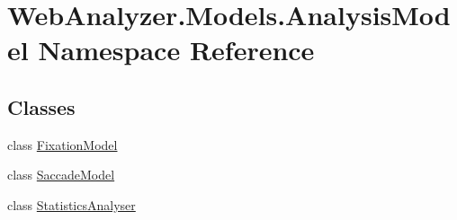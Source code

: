 \hypertarget{namespace_web_analyzer_1_1_models_1_1_analysis_model}{}\section{Web\+Analyzer.\+Models.\+Analysis\+Model Namespace Reference}
\label{namespace_web_analyzer_1_1_models_1_1_analysis_model}
\subsection*{Classes}
\begin{DoxyCompactItemize}
\item 
class \hyperlink{class_web_analyzer_1_1_models_1_1_analysis_model_1_1_fixation_model}{Fixation\+Model}
\item 
class \hyperlink{class_web_analyzer_1_1_models_1_1_analysis_model_1_1_saccade_model}{Saccade\+Model}
\item 
class \hyperlink{class_web_analyzer_1_1_models_1_1_analysis_model_1_1_statistics_analyser}{Statistics\+Analyser}
\end{DoxyCompactItemize}
